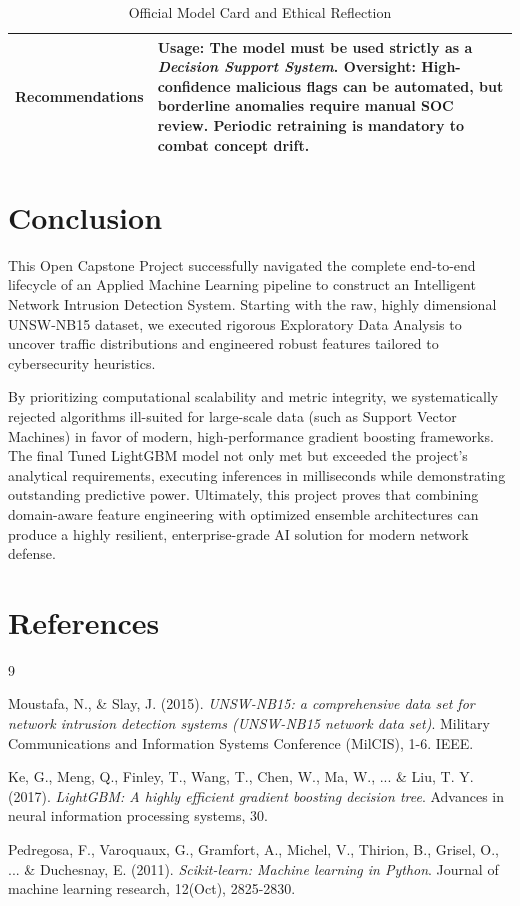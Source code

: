 \documentclass[12pt, a4paper]{article}
\begin{document}
\begin{table}[H]
\begin{tabular}{|p{}|p{}|}
\hline
\textbf{Recommendations} & \textbf{Usage:} The model must be used strictly as a \textit{Decision Support System}. \newline \textbf{Oversight:} High-confidence malicious flags can be automated, but borderline anomalies require manual SOC review. Periodic retraining is mandatory to combat concept drift. \\
\hline
\end{tabular}
\caption{Official Model Card and Ethical Reflection}
\label{tab:model_card}
\end{table}

\section{Conclusion}

This Open Capstone Project successfully navigated the complete end-to-end lifecycle of an Applied Machine Learning pipeline to construct an Intelligent Network Intrusion Detection System. Starting with the raw, highly dimensional UNSW-NB15 dataset, we executed rigorous Exploratory Data Analysis to uncover traffic distributions and engineered robust features tailored to cybersecurity heuristics. 

By prioritizing computational scalability and metric integrity, we systematically rejected algorithms ill-suited for large-scale data (such as Support Vector Machines) in favor of modern, high-performance gradient boosting frameworks. The final Tuned LightGBM model not only met but exceeded the project's analytical requirements, executing inferences in milliseconds while demonstrating outstanding predictive power. Ultimately, this project proves that combining domain-aware feature engineering with optimized ensemble architectures can produce a highly resilient, enterprise-grade AI solution for modern network defense.

\section{References}

\begin{thebibliography}{9}

Moustafa, N., \& Slay, J. (2015). 
\textit{UNSW-NB15: a comprehensive data set for network intrusion detection systems (UNSW-NB15 network data set)}. 
Military Communications and Information Systems Conference (MilCIS), 1-6. IEEE.

Ke, G., Meng, Q., Finley, T., Wang, T., Chen, W., Ma, W., ... \& Liu, T. Y. (2017). 
\textit{LightGBM: A highly efficient gradient boosting decision tree}. 
Advances in neural information processing systems, 30.

Pedregosa, F., Varoquaux, G., Gramfort, A., Michel, V., Thirion, B., Grisel, O., ... \& Duchesnay, E. (2011). 
\textit{Scikit-learn: Machine learning in Python}. 
Journal of machine learning research, 12(Oct), 2825-2830.

\end{thebibliography}
\end{document}
